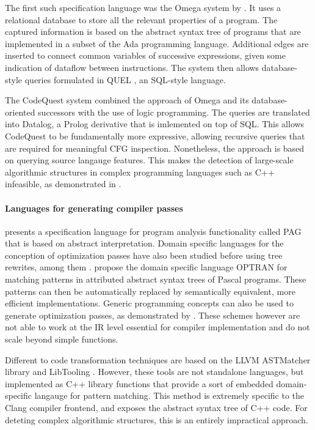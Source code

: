    The first such specification language was the Omega system by
    \citet{Linton:CSD-83-164}.
    It uses a relational database to store all the relevant properties of a
    program.
    The captured information is based on the abstract syntax tree of programs
    that are implemented in a subset of the Ada programming language.
    Additional edges are inserted to connect common variables of
    successive expressions, given some indication of dataflow between
    instructions.
    The system then allows database-style queries formulated in QUEL
    \citep{Stonebraker:1976:DII:320473.320476}, an SQL-style language.

    The CodeQuest system \citep{Hajiyev:2006:CSS:2171327.2171331} combined the
    approach of Omega and its database-oriented successors with the use of logic
    programming.
    The queries are translated into Datalog, a Prolog derivative that is
    imlemented on top of SQL.
    This allows CodeQuest to be fundamentally more expressive, allowing
    recursive queries that are required for meaningful CFG inspection.
    Nonetheless, the approach is based on querying source langauge features.
    This makes the detection of large-scale algorithmic structures in complex
    programming languages such as C++ infeasible, as demonstrated in
    .

    \paragraph*{Languages for generating compiler passes}
    \citet{Martin1998} presents a specification language for program analysis
    functionality called PAG that is based on abstract interpretation.
    Domain specific languages for the conception of optimization passes have
    also been studied before using tree rewrites, among them
    \citet{Olmos:2005:CSD:2136624.2136643}.
    \citet{Lipps1989} propose the domain specific language OPTRAN for matching
    patterns in attributed abstract syntax trees of Pascal programs.
    These patterns can then be automatically replaced by semantically
    equivalent, more efficient implementations.
    Generic programming concepts can also be used to generate optimization
    passes, as demonstrated by \cite{Willcock:2009:RGP:1621607.1621611}.
    These schemes however are not able to work at the IR level essential for
    compiler implementation and do not scale beyond simple functions.

    Different to code transformation techniques are based on the LLVM ASTMatcher
    library and LibTooling \citep{be0fa11ddb194bde86a9dab8589b779c}.
    However, these tools are not standalone languages, but implemented as C++
    library functions that provide a sort of embedded domain-specific langauge
    for pattern matching.
    This method is extremely specific to the Clang compiler frontend, and
    exposes the abstract syntax tree of C++ code.
    For deteting complex algorithmic structures, this is an entirely impractical
    approach.

